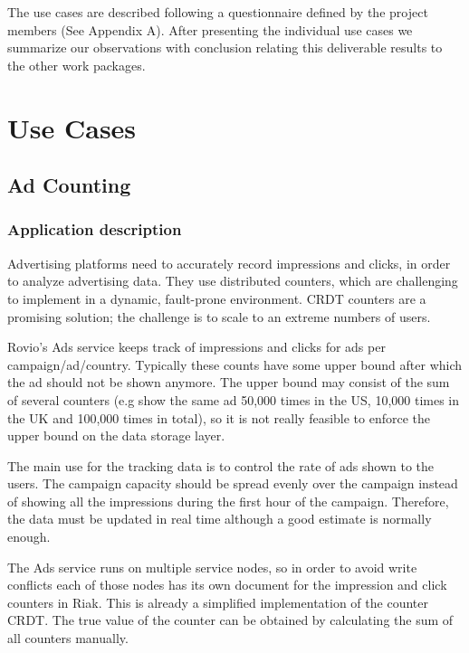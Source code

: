 \documentclass[11pt,a4paper]{report}
\begin{document}
The use cases are described following a questionnaire defined
by the project members (See Appendix A).
After presenting the individual use cases we summarize our
observations with conclusion relating this deliverable results to the
other work packages.

\chapter{Use Cases}
\section{Ad Counting}
\subsection{Application description}
Advertising platforms need to accurately record impressions and clicks, in order to analyze advertising data. They use distributed counters, which are challenging to implement in a dynamic, fault-prone environment. CRDT counters are a promising solution; the challenge is to scale to an extreme numbers of users. 
 
Rovio's Ads service keeps track of impressions and clicks for ads per campaign/ad/country. Typically these counts have some upper bound  after which the ad should not be shown anymore. The upper bound may consist of the sum of several counters (e.g show the same ad 50,000 times in the US, 10,000 times in the UK and 100,000 times in total), so it is not really feasible to enforce the upper bound on the data storage layer.

The main use for the tracking data is to control the rate of ads shown to the users. The campaign capacity should be spread evenly over the campaign instead of showing all the impressions during the first hour of the campaign. Therefore, the data must be updated in real time although a good estimate is normally enough.

The Ads service runs on multiple service nodes, so in order to avoid write conflicts each of those nodes has its own document for the impression and click counters in Riak. This is already a simplified implementation of the counter CRDT. The true value of the counter can be obtained by calculating the sum of all counters manually.
\end{document}
